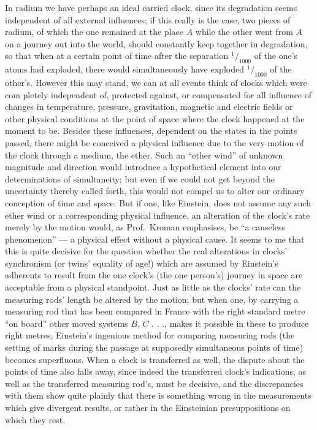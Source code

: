 \documentclass[12pt,a4paper]{article}
\begin{document}
In radium we have perhaps an ideal carried clock, since its degradation seems
independent of all external influences; if this really is the case, two pieces
of radium, of which the one remained at the place $A$ while the other went
from $A$ on a journey out into the world, should constantly keep together in
degradation, so that when at a certain point of time after the separation
$^{1}\!/_{1000}$ of the one's atoms had exploded, there would simultaneously
have exploded $^{1}\!/_{1000}$ of the other's. However this may stand, we can
at all events think of clocks which were com\-%
pletely independent of, protected against, or compensated for all influence of
changes in temperature, pressure, gravitation, magnetic and electric fields or
other physical conditions at the point of space where the clock happened at
the moment to be. Besides these influences, dependent on the states in the
points passed, there might be conceived a physical influence due to the very
motion of the clock through a medium, the ether. Such an ``ether wind'' of
unknown magnitude and direction would introduce a hypothetical element into
our determinations of simultaneity; but even if we could not get beyond the
uncertainty thereby called forth, this would not compel us to alter our
ordinary conception of time and space. But if one, like Einstein, does not
assume any such ether wind or a corresponding physical influence, an alteration
of the clock's rate merely by the motion would, as Prof.\ Kroman emphasises,
be ``a causeless phenomenon'' --- a physical effect without a physical cause.
It seems to me that this is quite decisive for the question whether the real
alterations in clocks' synchronism (or twins' equality of age!) which are
assumed by Einstein's adherents to result from the one clock's (the one
person's) journey in space are acceptable from a physical standpoint. Just as
little as the clocks' rate can the measuring rods' length be altered by the
motion; but when one, by carrying a measuring rod that has been compared in
France with the right standard metre ``on board'' other moved systems $B$,
$C$ . . ., makes it possible in these to produce right metres, Einstein's
ingenious method for comparing measuring rods (the setting of marks during the
passage at supposedly simultaneous points of time) becomes superfluous. When a
clock is transferred as well, the dispute about the points of time also falls
away, since indeed the transferred clock's indications, as well as the
transferred measuring rod's, must be decisive, and the discrepancies with them
show quite plainly that there is something wrong in the measurements which
give divergent results, or rather in the Einsteinian presuppositions on which
they rest.
\end{document}
